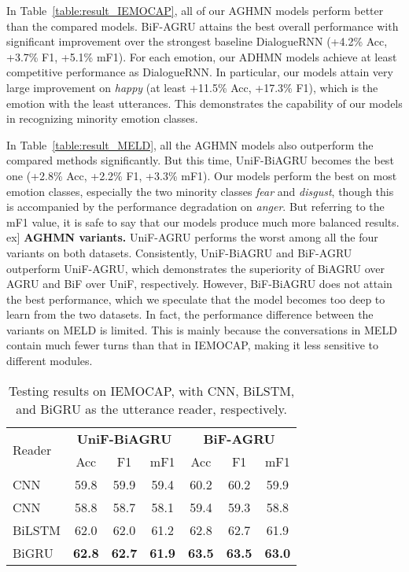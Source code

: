 \documentclass[letterpaper]{article} \usepackage{aaai20}  \usepackage{times}  \usepackage{helvet} \usepackage{courier}  \usepackage[hyphens]{url}  \usepackage{graphicx} \urlstyle{rm} \def\UrlFont{\rm}  \usepackage{graphicx}  \frenchspacing  \setlength{\pdfpagewidth}{8.5in}  \setlength{\pdfpageheight}{11in}
\begin{document}
In Table~\ref{table:result_IEMOCAP}, all of our AGHMN models perform better than the compared models. BiF-AGRU attains the best overall performance with significant improvement over the strongest baseline DialogueRNN (+4.2\% Acc, +3.7\% F1, +5.1\% mF1). For each emotion, our ADHMN models achieve at least competitive performance as DialogueRNN. In particular, our models attain very large improvement on \textit{happy} (at least +11.5\% Acc, +17.3\% F1), which is the emotion with the least utterances. This demonstrates the capability of our models in recognizing minority emotion classes.

In Table~\ref{table:result_MELD}, all the AGHMN models also outperform the compared methods significantly. But this time, UniF-BiAGRU becomes the best one (+2.8\% Acc, +2.2\% F1, +3.3\% mF1).
Our models perform the best on most emotion classes, especially the two minority classes \textit{fear} and \textit{disgust}, though this is accompanied by the performance degradation on \textit{anger}. But referring to the mF1 value, it is safe to say that our models produce much more balanced results. 
\1ex]
\noindent\textbf{AGHMN variants.} 
UniF-AGRU performs the worst among all the four variants on both datasets. Consistently, UniF-BiAGRU and BiF-AGRU outperform UniF-AGRU, which demonstrates the superiority of BiAGRU over AGRU and BiF over UniF, respectively.
However, BiF-BiAGRU does not attain the best performance, which we speculate that the model becomes too deep to learn from the two datasets. In fact, the performance difference between the variants on MELD is limited. This is mainly because the conversations in MELD contain much fewer turns than that in IEMOCAP, making it less sensitive to different modules.

\begin{table}[t!]
\small
\centering
\begin{threeparttable}
\begin{tabular}{l|ccc|ccc}
\toprule
\multirow{2}{*}{Reader} 
& \multicolumn{3}{c|}{\bf UniF-BiAGRU}
& \multicolumn{3}{c}{\bf BiF-AGRU} \\
\cline{2-7}
& Acc & F1 & mF1 & Acc & F1 & mF1 \\
\hline
\hline
CNN & 59.8&	59.9& 59.4& 60.2& 60.2& 59.9 \\
CNN & 58.8& 58.7& 58.1& 59.4& 59.3& 58.8 \\
BiLSTM & 62.0& 62.0& 61.2& 62.8& 62.7& 61.9 \\
BiGRU & \bf62.8& \bf62.7& \bf61.9& \bf63.5& \bf63.5& \bf63.0 \\
\bottomrule
\end{tabular}
\end{threeparttable}
\caption{\label{table:result_ReaderCompare}Testing results on IEMOCAP, with CNN, BiLSTM, and BiGRU as the utterance reader, respectively.}
\end{table}
\end{document}
